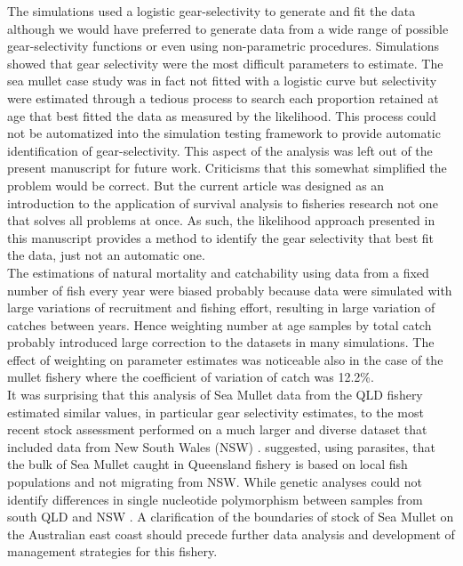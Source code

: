 The simulations used a logistic gear-selectivity to generate and fit the data although we would have preferred to generate data from a wide range of possible gear-selectivity functions or even using non-parametric procedures. Simulations showed that gear selectivity were the most difficult parameters to estimate. The sea mullet case study was in fact not fitted with a logistic curve but selectivity were estimated through a tedious process to search each proportion retained at age that best fitted the data as measured by the likelihood. This process could not be automatized into the simulation testing framework to provide automatic identification of gear-selectivity. This aspect of the analysis was left out of the present manuscript for future work. Criticisms that this somewhat simplified the problem would be correct. But the current article was designed as an introduction to the application of survival analysis to fisheries research not one that solves all problems at once. As such, the likelihood approach presented in this manuscript provides a method to identify the gear selectivity that best fit the data, just not an automatic one. \\ 

The estimations of natural mortality and catchability using data from a fixed number of fish every year were biased probably because data were simulated with large variations of recruitment and fishing effort, resulting in large variation of catches between years. Hence weighting number at age samples by total catch probably introduced large correction to the datasets in many simulations. The effect of weighting on parameter estimates was noticeable also in the case of the mullet fishery where the coefficient of variation of catch was 12.2\%.\\




It was surprising that this analysis of Sea Mullet data from the QLD fishery estimated similar values, in particular gear selectivity estimates, to the most recent stock assessment performed on a much larger and diverse dataset that included data from New South Wales (NSW) \citep{Bell2005r}. \cite{Lester2009129} suggested, using parasites, that the bulk of Sea Mullet caught in Queensland fishery is based on local fish populations and not migrating from NSW. While genetic analyses could not identify differences in single nucleotide polymorphism between samples from south QLD and NSW \citep{kruck2013a}. A clarification of the boundaries of stock of Sea Mullet on the Australian east coast should precede further data analysis and development of management strategies for this fishery.\\

